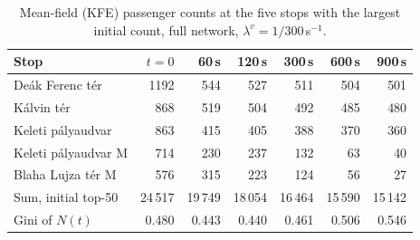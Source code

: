 \begin{table}[htbp]
\centering
\small
\begin{tabular}{lrrrrrr}
\toprule
Stop & $t=0$ & 60\,s & 120\,s & 300\,s & 600\,s & 900\,s \\
\midrule
De\'ak Ferenc t\'er & 1192 & 544 & 527 & 511 & 504 & 501 \\
K\'alvin t\'er & 868 & 519 & 504 & 492 & 485 & 480 \\
Keleti p\'alyaudvar & 863 & 415 & 405 & 388 & 370 & 360 \\
Keleti p\'alyaudvar M & 714 & 230 & 237 & 132 & 63 & 40 \\
Blaha Lujza t\'er M & 576 & 315 & 223 & 124 & 56 & 27 \\
\midrule
Sum, initial top-50 & 24\,517 & 19\,749 & 18\,054 & 16\,464 & 15\,590 & 15\,142 \\
Gini of $N(t)$ & 0.480 & 0.443 & 0.440 & 0.461 & 0.506 & 0.546 \\
\bottomrule
\end{tabular}
\caption{Mean-field (KFE) passenger counts at the five stops with the largest initial count, full network, $\lambda^v=1/300$\,s$^{-1}$.}
\label{tab:kfe-traj}
\end{table}
